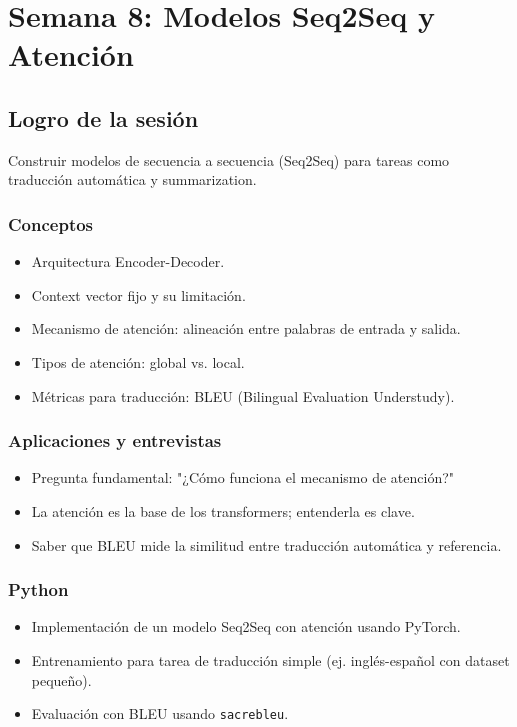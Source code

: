 \documentclass[12pt,a4paper,openany,oneside]{book}
\begin{document}
\chapter{Semana 8: Modelos Seq2Seq y Atención}

\section{Logro de la sesión}
Construir modelos de secuencia a secuencia (Seq2Seq) para tareas como traducción automática y summarization.

\subsection{Conceptos}
\begin{itemize}
    \item Arquitectura Encoder-Decoder.
    \item Context vector fijo y su limitación.
    \item Mecanismo de atención: alineación entre palabras de entrada y salida.
    \item Tipos de atención: global vs. local.
    \item Métricas para traducción: BLEU (Bilingual Evaluation Understudy).
\end{itemize}

\subsection{Aplicaciones y entrevistas}
\begin{itemize}
    \item Pregunta fundamental: "¿Cómo funciona el mecanismo de atención?"
    \item La atención es la base de los transformers; entenderla es clave.
    \item Saber que BLEU mide la similitud entre traducción automática y referencia.
\end{itemize}

\subsection{Python}
\begin{itemize}
    \item Implementación de un modelo Seq2Seq con atención usando PyTorch.
    \item Entrenamiento para tarea de traducción simple (ej. inglés-español con dataset pequeño).
    \item Evaluación con BLEU usando \texttt{sacrebleu}.
\end{itemize}
\end{document}
